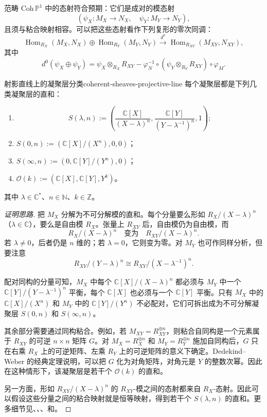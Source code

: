 范畴 $\mathrm{Coh}\,\mathbb P^1$ 中的态射符合预期：它们是成对的模态射
\[
  (\psi_X\colon M_X\to N_X,\quad \psi_Y\colon M_Y\to N_Y),
\]
且须与粘合映射相容。可以把这些态射看作下列复形的零次同调：
\[
  \operatorname{Hom}_{R_X}(M_X,N_X)\oplus
  \operatorname{Hom}_{R_Y}(M_Y,N_Y)
  \xrightarrow{\ d^0\ }
  \operatorname{Hom}_{R_{XY}}(M_{XY},N_{XY}),
\]
其中
\[
  d^0(\psi_X\oplus\psi_Y)
  =\psi_X\otimes_{R_X}R_{XY}
  -\varphi_N^{-1}\circ(\psi_Y\otimes_{R_Y}R_{XY})\circ\varphi_M.
\]

\begin{theorem}{射影直线上的凝聚层分类}{coherent-sheaves-projective-line}
每个凝聚层都是下列几类凝聚层的直和：
\begin{enumerate}[label=(\roman*)]
  \item
  \[
    S(\lambda,n):=
    \left(\frac{\mathbb C[X]}{(X-\lambda)^n},
    \frac{\mathbb C[Y]}{(Y-\lambda^{-1})^n},1\right);
  \]
  \item $S(0,n):=(\mathbb C[X]/(X^n),0,0)$；
  \item $S(\infty,n):=(0,\mathbb C[Y]/(Y^n),0)$；
  \item $\mathcal O(k):=(\mathbb C[X],\mathbb C[Y],Y^k)$。
\end{enumerate}
其中 $\lambda\in\mathbb C^*$、$n\in\mathbb N$、$k\in\mathbb Z$。
\end{theorem}
\begin{proof}[证明思路]
把 $M_X$ 分解为不可分解模的直和。每个分量要么形如 $R_X/(X-\lambda)^n$（$\lambda\in\mathbb C$），要么是自由模 $R_X$。张量上 $R_{XY}$ 后，自由模仍为自由模，而
\[
  R_X/(X-\lambda)^n\quad\text{变为}\quad
  R_{XY}/(X-\lambda)^n.
\]
若 $\lambda\ne0$，后者仍是 $n$ 维的；若 $\lambda=0$，它则变为零。对 $M_Y$ 也可作同样分析，但要注意
\[
  R_{XY}/(Y-\lambda)^n\cong R_{XY}/(X-\lambda^{-1})^n.
\]

配对同构的分量可知，$M_X$ 中每个 $\mathbb C[X]/(X-\lambda)^n$ 都必须与 $M_Y$ 中一个 $\mathbb C[Y]/(Y-\lambda^{-1})^n$ 平衡，每个 $\mathbb C[X]$ 也必须与一个 $\mathbb C[Y]$ 平衡。只有 $M_X$ 中的 $\mathbb C[X]/(X^n)$ 和 $M_Y$ 中的 $\mathbb C[Y]/(Y^n)$ 不必配对，它们可拆出成为不可分解凝聚层 $S(0,n)$ 和 $S(\infty,n)$。

其余部分需要通过同构粘合。例如，若 $M_{XY}=R_{XY}^{\oplus n}$，则粘合自同构是一个元素属于 $R_{XY}$ 的可逆 $n\times n$ 矩阵 $G$。对 $M_X=R_X^{\oplus n}$ 和 $M_Y=R_Y^{\oplus n}$ 施加自同构后，$G$ 只在右乘 $R_X$ 上的可逆矩阵、左乘 $R_Y$ 上的可逆矩阵的意义下确定。Dedekind–Weber 的经典定理说明，可以把 $G$ 化为对角矩阵，对角元是 $Y$ 的整数次幂。因此在这种情形下，该凝聚层是若干个 $\mathcal O(k)$ 的直和。

另一方面，形如 $R_{XY}/(X-\lambda)^n$ 的 $R_{XY}$-模之间的态射都来自 $R_X$-态射。因此可以假设这些分量之间的粘合映射就是恒等映射，得到若干个 $S(\lambda,n)$ 的直和。更多细节见、、、和。
\end{proof}

